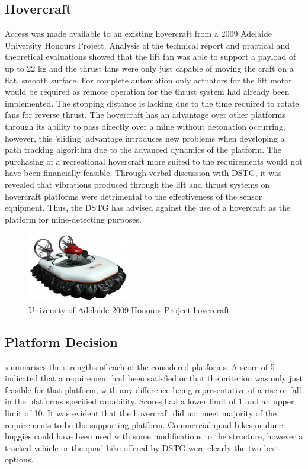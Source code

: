\documentclass[main.tex]{subfiles}
\begin{document}
\subsection{Hovercraft}
Access was made available to an existing hovercraft from a 2009 Adelaide University Honours Project. Analysis of the technical report \parencite{hovercraft2009} and practical and theoretical evaluations showed that the lift fan was able to support a payload of up to 22 kg and the thrust fans were only just capable of moving the craft on a flat, smooth surface. For complete automation only actuators for the lift motor would be required as remote operation for the thrust system had already been implemented. The stopping distance is lacking due to the time required to rotate fans for reverse thrust. The hovercraft has an advantage over other platforms through its ability to pass directly over a mine without detonation occurring, however, this 'sliding' advantage introduces new problems when developing a path tracking algorithm due to the advanced dynamics of the platform. The purchasing of a recreational hovercraft more suited to the requirements would not have been financially feasible. Through verbal discussion with DSTG, it was revealed that vibrations produced through the lift and thrust systems on hovercraft platforms were detrimental to the effectiveness of the sensor equipment. Thus, the DSTG has advised against the use of a hovercraft as the platform for mine-detecting purposes.
\begin{figure}[ht]
\includegraphics[width=0.4\textwidth]{4-ConceptDesign/HovercraftPic.png}
\centering
\caption[University of Adelaide 2009 Honours Project hovercraft]{University of Adelaide 2009 Honours Project hovercraft \parencite{hovercraft2009}} 
\end{figure}

\subsection{Platform Decision}
 summarises the strengths of each of the considered platforms. A score of 5 indicated that a requirement had been satisfied or that the criterion was only just feasible for that platform, with any difference being representative of a rise or fall in the platforms specified capability. Scores had a lower limit of 1 and an upper limit of 10. It was evident that the hovercraft did not meet majority of the requirements to be the supporting platform. Commercial quad bikes or dune buggies could have been used with some modifications to the structure, however a tracked vehicle or the quad bike offered by DSTG were clearly the two best options.
\end{document}
